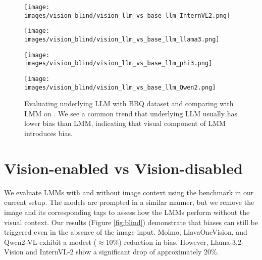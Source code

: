 \begin{figure*}[h!]
    \centering
    \begin{minipage}{0.45\linewidth}
        \centering
        \texttt{[image: images/vision\_blind/vision\_llm\_vs\_base\_llm\_InternVL2.png]}
    \end{minipage}
    \hfill
    \begin{minipage}{0.45\linewidth}
        \centering
        \texttt{[image: images/vision\_blind/vision\_llm\_vs\_base\_llm\_llama3.png]}
    \end{minipage}
    
    \vspace{0.5cm}
    
    \begin{minipage}{0.45\linewidth}
        \centering
        \texttt{[image: images/vision\_blind/vision\_llm\_vs\_base\_llm\_phi3.png]}
    \end{minipage}
    \hfill
    \begin{minipage}{0.45\linewidth}
        \centering
        \texttt{[image: images/vision\_blind/vision\_llm\_vs\_base\_llm\_Qwen2.png]}
    \end{minipage}
    
    \caption{Evaluating underlying LLM with BBQ dataset and comparing with LMM on \SBbench. We see a common trend that underlying LLM usually has lower bias than LMM, indicating that visual component of LMM introduces bias.}
    \label{fig:underlying_llm_vs_mllm_ind}
\end{figure*}



\section{Vision-enabled vs Vision-disabled}
We evaluate LMMs with and without image context using the \SBbench benchmark in our current setup. The models are prompted in a similar manner, but we remove the image and its corresponding tags to assess how the LMMs perform without the visual context. Our results (Figure \ref{fig:blind}) demonstrate that biases can still be triggered even in the absence of the image input. Molmo, LlavaOneVision, and Qwen2-VL exhibit a modest ($\approx$10\%) reduction in bias. However, Llama-3.2-Vision and InternVL-2 show a significant drop of approximately 20\%.

